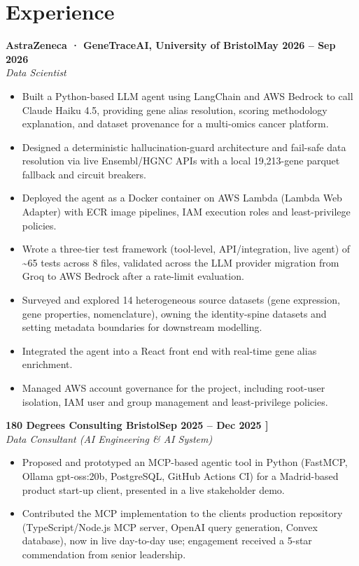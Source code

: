 \documentclass[a4paper,11pt]{article}
\newcommand{\entry}[4]{\needspace{4\baselineskip}\noindent\textbf{#1}\hfill\textbf{#2}\\ \textit{#3}\hfill\textit{#4}\par}
\begin{document}
\section{Experience}
\entry{AstraZeneca · GeneTraceAI, University of Bristol}{May 2026 – Sep 2026}{Data Scientist}{}
\begin{itemize}
  \item Built a Python-based LLM agent using LangChain and AWS Bedrock to call Claude Haiku 4.5, providing gene alias resolution, scoring methodology explanation, and dataset provenance for a multi-omics cancer platform.
  \item Designed a deterministic hallucination-guard architecture and fail-safe data resolution via live Ensembl/HGNC APIs with a local 19,213-gene parquet fallback and circuit breakers.
  \item Deployed the agent as a Docker container on AWS Lambda (Lambda Web Adapter) with ECR image pipelines, IAM execution roles and least-privilege policies.
  \item Wrote a three-tier test framework (tool-level, API/integration, live agent) of \textasciitilde{}65 tests across 8 files, validated across the LLM provider migration from Groq to AWS Bedrock after a rate-limit evaluation.
  \item Surveyed and explored 14 heterogeneous source datasets (gene expression, gene properties, nomenclature), owning the identity-spine datasets and setting metadata boundaries for downstream modelling.
  \item Integrated the agent into a React front end with real-time gene alias enrichment.
  \item Managed AWS account governance for the project, including root-user isolation, IAM user and group management and least-privilege policies.
\end{itemize}
\vspace{4pt}
\entry{180 Degrees Consulting Bristol}{Sep 2025 – Dec 2025   ]}{Data Consultant (AI Engineering \& AI System)}{}
\begin{itemize}
  \item Proposed and prototyped an MCP-based agentic tool in Python (FastMCP, Ollama gpt-oss:20b, PostgreSQL, GitHub Actions CI) for a Madrid-based product start-up client, presented in a live stakeholder demo.
  \item Contributed the MCP implementation to the client\textquotesingle{}s production repository (TypeScript/Node.js MCP server, OpenAI query generation, Convex database), now in live day-to-day use; engagement received a 5-star commendation from senior leadership.
\end{itemize}
\end{document}
